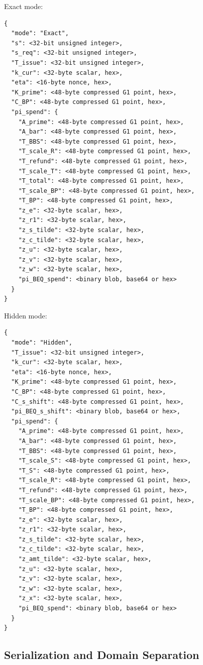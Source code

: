 \documentclass[11pt]{article}
\theoremstyle{definitionstyle}
\theoremstyle{plain}
\begin{document}
Exact mode:
\begin{verbatim}
{
  "mode": "Exact",
  "s": <32-bit unsigned integer>,
  "s_req": <32-bit unsigned integer>,
  "T_issue": <32-bit unsigned integer>,
  "k_cur": <32-byte scalar, hex>,
  "eta": <16-byte nonce, hex>,
  "K_prime": <48-byte compressed G1 point, hex>,
  "C_BP": <48-byte compressed G1 point, hex>,
  "pi_spend": {
    "A_prime": <48-byte compressed G1 point, hex>,
    "A_bar": <48-byte compressed G1 point, hex>,
    "T_BBS": <48-byte compressed G1 point, hex>,
    "T_scale_R": <48-byte compressed G1 point, hex>,
    "T_refund": <48-byte compressed G1 point, hex>,
    "T_scale_T": <48-byte compressed G1 point, hex>,
    "T_total": <48-byte compressed G1 point, hex>,
    "T_scale_BP": <48-byte compressed G1 point, hex>,
    "T_BP": <48-byte compressed G1 point, hex>,
    "z_e": <32-byte scalar, hex>,
    "z_r1": <32-byte scalar, hex>,
    "z_s_tilde": <32-byte scalar, hex>,
    "z_c_tilde": <32-byte scalar, hex>,
    "z_u": <32-byte scalar, hex>,
    "z_v": <32-byte scalar, hex>,
    "z_w": <32-byte scalar, hex>,
    "pi_BEQ_spend": <binary blob, base64 or hex>
  }
}
\end{verbatim}

Hidden mode:
\begin{verbatim}
{
  "mode": "Hidden",
  "T_issue": <32-bit unsigned integer>,
  "k_cur": <32-byte scalar, hex>,
  "eta": <16-byte nonce, hex>,
  "K_prime": <48-byte compressed G1 point, hex>,
  "C_BP": <48-byte compressed G1 point, hex>,
  "C_s_shift": <48-byte compressed G1 point, hex>,
  "pi_BEQ_s_shift": <binary blob, base64 or hex>,
  "pi_spend": {
    "A_prime": <48-byte compressed G1 point, hex>,
    "A_bar": <48-byte compressed G1 point, hex>,
    "T_BBS": <48-byte compressed G1 point, hex>,
    "T_scale_S": <48-byte compressed G1 point, hex>,
    "T_S": <48-byte compressed G1 point, hex>,
    "T_scale_R": <48-byte compressed G1 point, hex>,
    "T_refund": <48-byte compressed G1 point, hex>,
    "T_scale_BP": <48-byte compressed G1 point, hex>,
    "T_BP": <48-byte compressed G1 point, hex>,
    "z_e": <32-byte scalar, hex>,
    "z_r1": <32-byte scalar, hex>,
    "z_s_tilde": <32-byte scalar, hex>,
    "z_c_tilde": <32-byte scalar, hex>,
    "z_amt_tilde": <32-byte scalar, hex>,
    "z_u": <32-byte scalar, hex>,
    "z_v": <32-byte scalar, hex>,
    "z_w": <32-byte scalar, hex>,
    "z_x": <32-byte scalar, hex>,
    "pi_BEQ_spend": <binary blob, base64 or hex>
  }
}
\end{verbatim}

\subsection{Serialization and Domain Separation}
\end{document}
